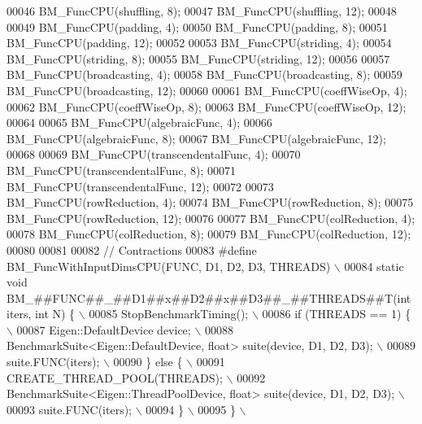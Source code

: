 \begin{DoxyCode}
00046 BM\_FuncCPU(shuffling, 8);
00047 BM\_FuncCPU(shuffling, 12);
00048 
00049 BM\_FuncCPU(padding, 4);
00050 BM\_FuncCPU(padding, 8);
00051 BM\_FuncCPU(padding, 12);
00052 
00053 BM\_FuncCPU(striding, 4);
00054 BM\_FuncCPU(striding, 8);
00055 BM\_FuncCPU(striding, 12);
00056 
00057 BM\_FuncCPU(broadcasting, 4);
00058 BM\_FuncCPU(broadcasting, 8);
00059 BM\_FuncCPU(broadcasting, 12);
00060 
00061 BM\_FuncCPU(coeffWiseOp, 4);
00062 BM\_FuncCPU(coeffWiseOp, 8);
00063 BM\_FuncCPU(coeffWiseOp, 12);
00064 
00065 BM\_FuncCPU(algebraicFunc, 4);
00066 BM\_FuncCPU(algebraicFunc, 8);
00067 BM\_FuncCPU(algebraicFunc, 12);
00068 
00069 BM\_FuncCPU(transcendentalFunc, 4);
00070 BM\_FuncCPU(transcendentalFunc, 8);
00071 BM\_FuncCPU(transcendentalFunc, 12);
00072 
00073 BM\_FuncCPU(rowReduction, 4);
00074 BM\_FuncCPU(rowReduction, 8);
00075 BM\_FuncCPU(rowReduction, 12);
00076 
00077 BM\_FuncCPU(colReduction, 4);
00078 BM\_FuncCPU(colReduction, 8);
00079 BM\_FuncCPU(colReduction, 12);
00080 
00081 
00082 \textcolor{comment}{// Contractions}
00083 \textcolor{preprocessor}{#define BM\_FuncWithInputDimsCPU(FUNC, D1, D2, D3, THREADS)                      \(\backslash\)}
00084 \textcolor{preprocessor}{  static void BM\_##FUNC##\_##D1##x##D2##x##D3##\_##THREADS##T(int iters, int N) \{ \(\backslash\)}
00085 \textcolor{preprocessor}{    StopBenchmarkTiming();                                                      \(\backslash\)}
00086 \textcolor{preprocessor}{    if (THREADS == 1) \{                                                         \(\backslash\)}
00087 \textcolor{preprocessor}{      Eigen::DefaultDevice device;                                              \(\backslash\)}
00088 \textcolor{preprocessor}{      BenchmarkSuite<Eigen::DefaultDevice, float> suite(device, D1, D2, D3);    \(\backslash\)}
00089 \textcolor{preprocessor}{      suite.FUNC(iters);                                                        \(\backslash\)}
00090 \textcolor{preprocessor}{    \} else \{                                                                    \(\backslash\)}
00091 \textcolor{preprocessor}{      CREATE\_THREAD\_POOL(THREADS);                                              \(\backslash\)}
00092 \textcolor{preprocessor}{      BenchmarkSuite<Eigen::ThreadPoolDevice, float> suite(device, D1, D2, D3); \(\backslash\)}
00093 \textcolor{preprocessor}{      suite.FUNC(iters);                                                        \(\backslash\)}
00094 \textcolor{preprocessor}{    \}                                                                           \(\backslash\)}
00095 \textcolor{preprocessor}{  \}                                                                             \(\backslash\)}

\end{DoxyCode}
